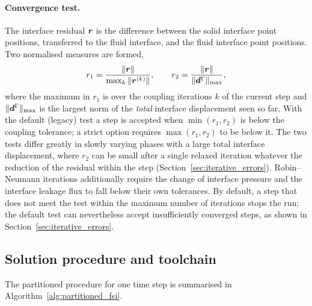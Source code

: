 \paragraph{Convergence test.}
The interface residual $\boldsymbol{r}$ is the difference between the solid interface point positions, transferred to the fluid interface, and the fluid interface point positions.
Two normalised measures are formed,
\begin{equation}
	r_1 = \frac{\|\boldsymbol{r}\|}{\max_k \|\boldsymbol{r}^{(k)}\|},
	\qquad
	r_2 = \frac{\|\boldsymbol{r}\|}{\|\boldsymbol{d}^\Gamma\|_{\max}},
	\label{eq:coupling_residuals}
\end{equation}
where the maximum in $r_1$ is over the coupling iterations $k$ of the current step and $\|\boldsymbol{d}^\Gamma\|_{\max}$ is the largest norm of the \emph{total} interface displacement seen so far.
With the default (legacy) test a step is accepted when $\min(r_1, r_2)$ is below the coupling tolerance; a strict option requires $\max(r_1, r_2)$ to be below it.
The two tests differ greatly in slowly varying phases with a large total interface displacement, where $r_2$ can be small after a single relaxed iteration whatever the reduction of the residual within the step (Section~\ref{sec:iterative_errors}).
Robin--Neumann iterations additionally require the change of interface pressure and the interface leakage flux to fall below their own tolerances.
By default, a step that does not meet the test within the maximum number of iterations stops the run; the default test can nevertheless accept insufficiently converged steps, as shown in Section~\ref{sec:iterative_errors}.

\subsection{Solution procedure and toolchain}\label{sec:implementation_details}

The partitioned procedure for one time step is summarised in Algorithm~\ref{alg:partitioned_fsi}.


